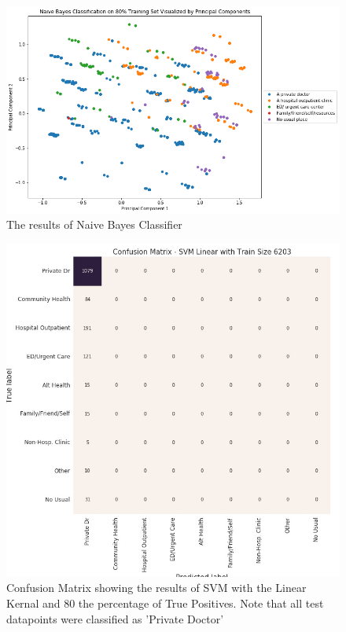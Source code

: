 \documentclass[10pt,twocolumn]{article}
\begin{document}
\begin{figure}[!t]
  \begin{center}
    \includegraphics[width=6in]{PCA_NaiveBayes.png}
  \end{center}

  \caption{\small The results of Naive Bayes Classifier}
  \label{fig-1}
\end{figure}

\begin{figure}[!t]
  \begin{center}
    \includegraphics[width=6in]{confusion_matrix_SVM_Linear_6203.jpg}
  \end{center}

  \caption{\small Confusion Matrix showing the results of SVM with the Linear Kernal and
  80%
  the percentage of True Positives. Note that all test datapoints were classified
  as 'Private Doctor'}
  \label{fig-2}
\end{figure}
\end{document}
